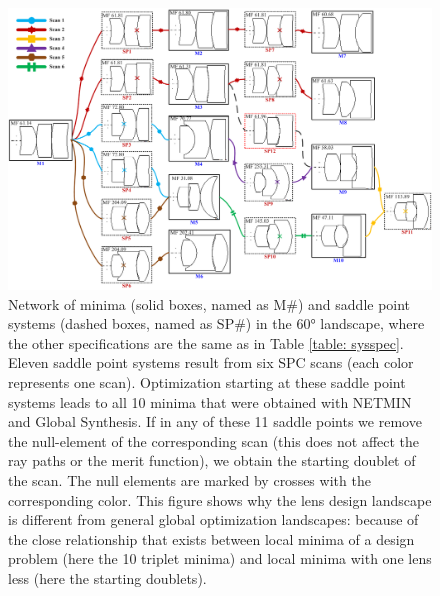 \begin{figure}[h!]
    \centering
    \includegraphics[scale=0.41]{chapter-3/figures/TripletNetwork.png}
    \caption{Network of minima (solid boxes, named as M\#) and saddle point systems (dashed boxes, named as SP\#) in the 60° landscape, where the other specifications are the same as in Table \ref{table: sysspec}. Eleven saddle point systems result from six SPC scans (each color represents one scan). Optimization starting at these saddle point systems leads to all 10 minima that were obtained with NETMIN and Global Synthesis. If in any of these 11 saddle points we remove the null-element of the corresponding scan (this does not affect the ray paths or the merit function), we obtain the starting doublet of the scan. The null elements are marked by crosses with the corresponding color. This figure shows why the lens design landscape is different from general global optimization landscapes: because of the close relationship that exists between local minima of a design problem (here the 10 triplet minima) and local minima with one lens less (here the starting doublets).}\label{fig:tripletnetwork}
\end{figure}

